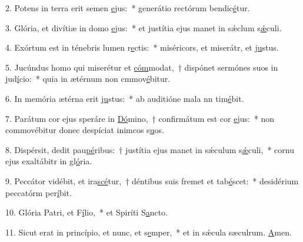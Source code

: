 2. Potens in terra erit semen \uline{e}jus:~* generátio rectórum bendic\uline{é}tur.\par 
3. Glória, et divítiæ in domo \uline{e}jus:~* et justítia ejus manet in sǽclum s\uline{ǽ}culi.\par 
4. Exórtum est in ténebris lumen r\uline{e}ctis:~* miséricors, et miserátr, et j\uline{u}stus.\par 
5. Jucúndus homo qui miserétur et \uline{cóm}modat,~† dispónet sermónes suos in jud\uline{í}cio:~* quia in ætérnum non cmmov\uline{é}bitur.\par 
6. In memória ætérna erit j\uline{u}stus:~* ab auditióne mala nn tim\uline{é}bit.\par 
7. Parátum cor ejus speráre in \uline{Dó}mino,~† confirmátum est cor \uline{e}jus:~* non commovébitur donec despíciat inimcos s\uline{u}os.\par 
8. Dispérsit, dedit pau\uline{pé}ribus:~† justítia ejus manet in sǽculum s\uline{ǽ}culi,~* cornu ejus exaltábitr in gl\uline{ó}ria.\par 
9. Peccátor vidébit, et ira\uline{scé}tur,~† déntibus suis fremet et tab\uline{é}scet:~* desidérium peccatórm per\uline{í}bit.\par 
10. Glória Patri, et F\uline{í}lio,~* et Spiríti S\uline{a}ncto.\par 
11. Sicut erat in princípio, et nunc, et s\uline{e}mper,~* et in sǽcula sæculrum. \uline{A}men.\par 
